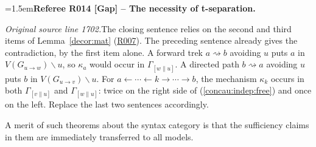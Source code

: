 \documentclass[12pt]{amsart}
\newcommand{\RefereeRemark}[4]{%
  \par\medskip\begingroup\normalfont\small\color{RefereePurple}%
  \emergencystretch=1.5em\noindent\textbf{Referee R#1 [#2] -- #3.}\par\nobreak\noindent #4\par
  \endgroup\medskip
}
\theoremstyle{plain}
\theoremstyle{definition}
\theoremstyle{remark}
\numberwithin{equation}{section}
\theoremstyle{plain}
\newcommand{\0}{\emptyset}
\newcommand{\mi}{\smallsetminus}
\newcommand{\stri}{\Gamma}
\begin{document}
\hypertarget{review-014}{}\RefereeRemark{014}{Gap}{The necessity of t-separation}{%
\textit{Original source line 1702.}\quad The closing sentence relies on the second and third items of Lemma~\ref{decor:mat} (\hyperlink{review-007}{R007}). The preceding sentence already gives the contradiction, by the first item alone. A forward trek $a \rightsquigarrow b$ avoiding $u$ puts $a$ in $V(G_{u \rightarrow w}) \mi u$, so $\kappa_a$ would occur in $\stri_{[w \| u]}$. A directed path $b \rightsquigarrow a$ avoiding $u$ puts $b$ in $V(G_{u \rightarrow v}) \mi u$. For $a \leftarrow \cdots \leftarrow k \rightarrow \cdots \rightarrow b$, the mechanism $\kappa_k$ occurs in both $\stri_{[v \| u]}$ and $\stri_{[w \| u]}$: twice on the right side of (\ref{concau:indep:free}) and once on the left. Replace the last two sentences accordingly.
}

A merit of such theorems about the syntax category is that the sufficiency claims in them are immediately transferred to all models.
\end{document}
